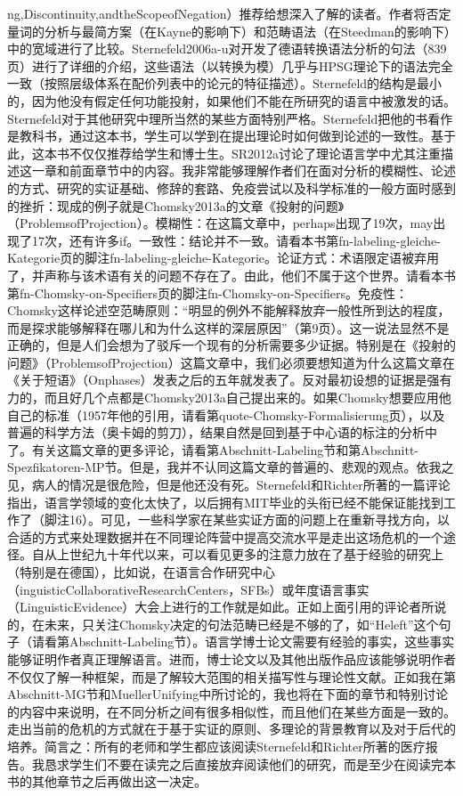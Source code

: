 ng,Discontinuity,andtheScopeofNegation）推荐给想深入了解的读者。作者将否定量词的分析与最简方案（在Kayne的影响下）和范畴语法（在Steedman的影响下）中的宽域进行了比较。Sternefeld2006a-u对开发了德语转换语法分析的句法（839页）进行了详细的介绍，这些语法（以转换为模）几乎与HPSG理论下的语法完全一致（按照层级体系在配价列表中的论元的特征描述）。Sternefeld的结构是最小的，因为他没有假定任何功能投射，如果他们不能在所研究的语言中被激发的话。Sternefeld对于其他研究中理所当然的某些方面特别严格。Sternefeld把他的书看作是教科书，通过这本书，学生可以学到在提出理论时如何做到论述的一致性。基于此，这本书不仅仅推荐给学生和博士生。SR2012a讨论了理论语言学中尤其注重描述这一章和前面章节中的内容。我非常能够理解作者们在面对分析的模糊性、论述的方式、研究的实证基础、修辞的套路、免疫尝试以及科学标准的一般方面时感到的挫折：现成的例子就是Chomsky2013a的文章《投射的问题》（ProblemsofProjection）。模糊性：在这篇文章中，perhaps出现了19次，may出现了17次，还有许多if。一致性：结论并不一致。请看本书第fn-labeling-gleiche-Kategorie页的脚注fn-labeling-gleiche-Kategorie。论证方式：术语限定语被弃用了，并声称与该术语有关的问题不存在了。由此，他们不属于这个世界。请看本书第fn-Chomsky-on-Specifiers页的脚注fn-Chomsky-on-Specifiers。免疫性：Chomsky这样论述空范畴原则：“明显的例外不能解释放弃一般性所到达的程度，而是探求能够解释在哪儿和为什么这样的深层原因”（第9页）。这一说法显然不是正确的，但是人们会想为了驳斥一个现有的分析需要多少证据。特别是在《投射的问题》（ProblemsofProjection）这篇文章中，我们必须要想知道为什么这篇文章在《关于短语》（Onphases）发表之后的五年就发表了。反对最初设想的证据是强有力的，而且好几个点都是Chomsky2013a自己提出来的。如果Chomsky想要应用他自己的标准（1957年他的引用，请看第quote-Chomsky-Formalisierung页），以及普遍的科学方法（奥卡姆的剪刀），结果自然是回到基于中心语的标注的分析中了。有关这篇文章的更多评论，请看第Abschnitt-Labeling节和第Abschnitt-Spezfikatoren-MP节。但是，我并不认同这篇文章的普遍的、悲观的观点。依我之见，病人的情况是很危险，但是他还没有死。Sternefeld和Richter所著的一篇评论指出，语言学领域的变化太快了，以后拥有MIT毕业的头衔已经不能保证能找到工作了（脚注16）。可见，一些科学家在某些实证方面的问题上在重新寻找方向，以合适的方式来处理数据并在不同理论阵营中提高交流水平是走出这场危机的一个途径。自从上世纪九十年代以来，可以看见更多的注意力放在了基于经验的研究上（特别是在德国），比如说，在语言合作研究中心（inguisticCollaborativeResearchCenters，SFBs）或年度语言事实（LinguisticEvidence）大会上进行的工作就是如此。正如上面引用的评论者所说的，在未来，只关注Chomsky决定的句法范畴已经是不够的了，如“Heleft”这个句子（请看第Abschnitt-Labeling节）。语言学博士论文需要有经验的事实，这些事实能够证明作者真正理解语言。进而，博士论文以及其他出版作品应该能够说明作者不仅仅了解一种框架，而是了解较大范围的相关描写性与理论性文献。正如我在第Abschnitt-MG节和MuellerUnifying中所讨论的，我也将在下面的章节和特别讨论的内容中来说明，在不同分析之间有很多相似性，而且他们在某些方面是一致的。走出当前的危机的方式就在于基于实证的原则、多理论的背景教育以及对于后代的培养。简言之：所有的老师和学生都应该阅读Sternefeld和Richter所著的医疗报告。我恳求学生们不要在读完之后直接放弃阅读他们的研究，而是至少在阅读完本书的其他章节之后再做出这一决定。
